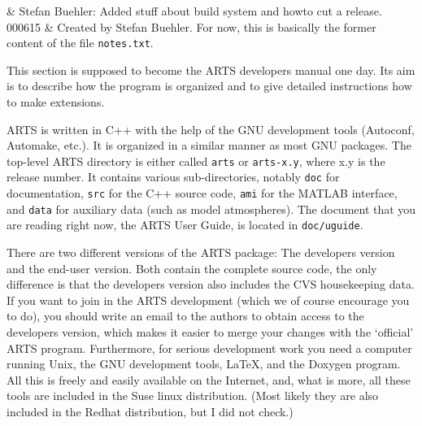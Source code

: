 %
%
 \label{sec:development}

%
%
 & Stefan Buehler: Added stuff about build system and howto cut a release. \\
  000615 & Created by Stefan Buehler. For now, this is basically the
  former content of the file \verb|notes.txt|. \\
\stophistory

%
%
%

%
%
This section is supposed to become the ARTS developers manual one day.
Its aim is to describe how the program is organized and to give
detailed instructions how to make extensions.

\label{sec:development:org}
 
ARTS is written in C++ with the help of the GNU development tools
(Autoconf, Automake, etc.). It is organized in a similar manner as
most GNU packages. The top-level ARTS directory is either called
\verb|arts| or \verb|arts-x.y|, where x.y is the release number. It
contains various sub-directories, notably \verb|doc| for
documentation, \verb|src| for the C++ source code, \verb|ami| for the
MATLAB interface, and \verb|data| for auxiliary data (such as model
atmospheres). The document that you are reading right now, the ARTS
User Guide, is located in \verb|doc/uguide|.

There are two different versions of the ARTS package: The developers
version and the end-user version. Both contain the complete source
code, the only difference is that the developers version also includes
the CVS housekeeping data. If you want to join in the ARTS development
(which we of course encourage you to do), you should write an email to
the authors to obtain access to the developers version, which makes it
easier to merge your changes with the `official' ARTS program.
Furthermore, for serious development work you need a computer running
Unix, the GNU development tools, LaTeX, and the Doxygen program.  All
this is freely and easily available on the Internet, and, what is
more, all these tools are included in the Suse linux
distribution. (Most likely they are also included in the Redhat
distribution, but I did not check.)

